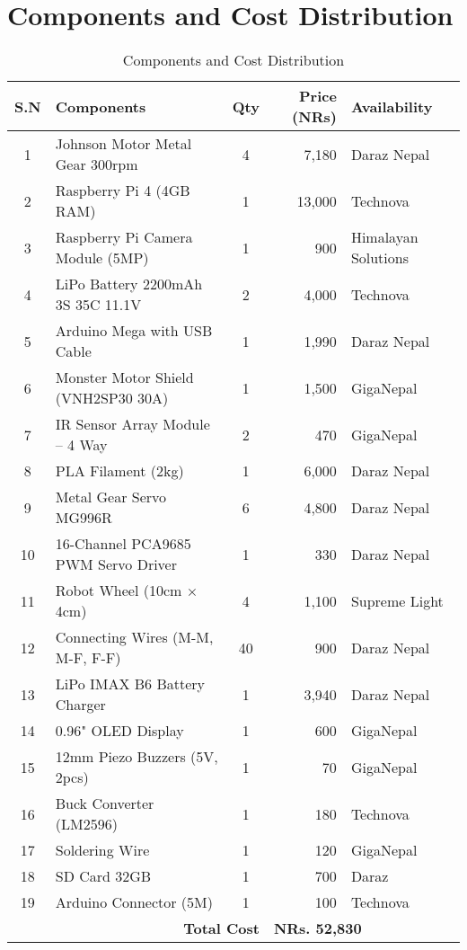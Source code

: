 \section*{Components and Cost Distribution}

\begin{table}[h]
\centering
\small  %
\renewcommand{\arraystretch}{1.05}  %
\begin{tabular}{|c|p{4.6cm}|c|r|p{3cm}|}
\hline
\textbf{S.N} & \textbf{Components} & \textbf{Qty} & \textbf{Price (NRs)} & \textbf{Availability} \\
\hline
1  & Johnson Motor Metal Gear 300rpm & 4 & 7,180  & Daraz Nepal \\\hline
2  & Raspberry Pi 4 (4GB RAM) & 1 & 13,000 & Technova \\\hline
3  & Raspberry Pi Camera Module (5MP) & 1 & 900 & Himalayan Solutions \\\hline
4  & LiPo Battery 2200mAh 3S 35C 11.1V & 2 & 4,000 & Technova \\\hline
5  & Arduino Mega with USB Cable & 1 & 1,990 & Daraz Nepal \\\hline
6  & Monster Motor Shield (VNH2SP30 30A) & 1 & 1,500 & GigaNepal \\\hline
7  & IR Sensor Array Module – 4 Way & 2 & 470 & GigaNepal \\\hline
8  & PLA Filament (2kg) & 1 & 6,000 & Daraz Nepal \\\hline
9  & Metal Gear Servo MG996R & 6 & 4,800 & Daraz Nepal \\\hline
10 & 16-Channel PCA9685 PWM Servo Driver & 1 & 330 & Daraz Nepal \\\hline
11 & Robot Wheel (10cm × 4cm) & 4 & 1,100 & Supreme Light \\\hline
12 & Connecting Wires (M-M, M-F, F-F) & 40 & 900 & Daraz Nepal \\\hline
13 & LiPo IMAX B6 Battery Charger & 1 & 3,940 & Daraz Nepal \\\hline
14 & 0.96" OLED Display & 1 & 600 & GigaNepal \\\hline
15 & 12mm Piezo Buzzers (5V, 2pcs) & 1 & 70 & GigaNepal \\\hline
16 & Buck Converter (LM2596) & 1 & 180 & Technova \\\hline
17 & Soldering Wire & 1 & 120 & GigaNepal \\\hline
18 & SD Card 32GB & 1 & 700 & Daraz \\\hline
19 & Arduino Connector (5M) & 1 & 100 & Technova \\
\hline
\multicolumn{3}{|r|}{\textbf{Total Cost}} & \multicolumn{2}{l|}{\textbf{NRs. 52,830}} \\
\hline
\end{tabular}
\caption{Components and Cost Distribution}
\end{table}
